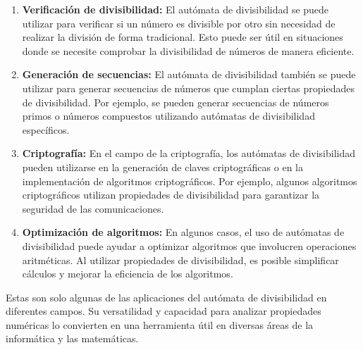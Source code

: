 \begin{enumerate}
	\item \textbf{Verificación de divisibilidad:} El autómata de divisibilidad se puede utilizar para verificar si un número es divisible por otro sin necesidad de realizar la división de forma tradicional. Esto puede ser útil en situaciones donde se necesite comprobar la divisibilidad de números de manera eficiente.
	\item \textbf{Generación de secuencias:} El autómata de divisibilidad también se puede utilizar para generar secuencias de números que cumplan ciertas propiedades de divisibilidad. Por ejemplo, se pueden generar secuencias de números primos o números compuestos utilizando autómatas de divisibilidad específicos.
	\item \textbf{Criptografía:} En el campo de la criptografía, los autómatas de divisibilidad pueden utilizarse en la generación de claves criptográficas o en la implementación de algoritmos criptográficos. Por ejemplo, algunos algoritmos criptográficos utilizan propiedades de divisibilidad para garantizar la seguridad de las comunicaciones.
	\item \textbf{Optimización de algoritmos:} En algunos casos, el uso de autómatas de divisibilidad puede ayudar a optimizar algoritmos que involucren operaciones aritméticas. Al utilizar propiedades de divisibilidad, es posible simplificar cálculos y mejorar la eficiencia de los algoritmos.
\end{enumerate}

Estas son solo algunas de las aplicaciones del autómata de divisibilidad en diferentes campos. Su versatilidad y capacidad para analizar propiedades numéricas lo convierten en una herramienta útil en diversas áreas de la informática y las matemáticas.